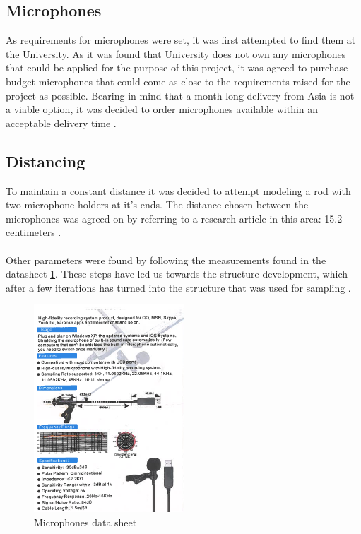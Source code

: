\subsection{Microphones}
As requirements for microphones were set, it was first attempted to find them at the University. As it was found that University does not own any microphones that could be applied for the purpose of this project, it was agreed to purchase budget microphones that could come as close to the requirements raised for the project as possible. Bearing in mind that a month-long delivery from Asia is not a viable option, it was decided to order microphones available within an acceptable delivery time .\\

\subsection{Distancing}
To maintain a constant distance it was decided to attempt modeling a rod with two microphone holders at it's ends. The distance chosen between the microphones was agreed on by referring to a research article in this area: 15.2 centimeters . 
\paragraph{}
Other parameters were found by following the measurements found in the datasheet \ref{fig:MicData}. These steps have led us towards the structure development, which after a few iterations has turned into the structure that was used for sampling .
\begin{figure} [htp] 
  \centering
    \includegraphics[width=0.5\textwidth]{Illustrations/MicData}
    \caption{Microphones data sheet}
    \label{fig:MicData}
\end{figure}

